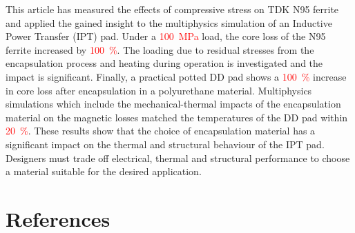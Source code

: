 \documentclass[conference]{IEEEtran}
\begin{document}
This article has measured the effects of compressive stress on TDK N95 ferrite and applied the gained insight to the multiphysics simulation of an Inductive Power Transfer (IPT) pad. 
Under a \textcolor{red}{\SI{100}{\mega\pascal}} load, the core loss of the N95 ferrite increased by \textcolor{red}{\SI{100}{\percent}}. 
The loading due to residual stresses from the encapsulation process and heating during operation is investigated and the impact is significant. 
Finally, a practical potted DD pad shows a \textcolor{red}{\SI{100}{\percent}} increase in core loss after encapsulation in a polyurethane material. 
Multiphysics simulations which include the mechanical-thermal impacts of the encapsulation material on the magnetic losses matched the temperatures of the DD pad within \textcolor{red}{\SI{20}{\percent}}. 
These results show that the choice of encapsulation material has a significant impact on the thermal and structural behaviour of the IPT pad. 
Designers must trade off electrical, thermal and structural performance to choose a material suitable for the desired application.

\section*{References}

\printbibliography[heading=none]
\end{document}
